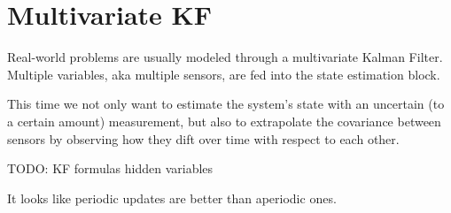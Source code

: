 \section{Multivariate KF}
Real-world problems are usually modeled through a multivariate Kalman Filter.
Multiple variables, aka multiple sensors, are fed into the state estimation block.

This time we not only want to estimate the system's state with an uncertain (to a certain amount) measurement, but also to extrapolate the covariance between sensors by observing how they dift over time with respect to each other.

TODO: KF formulas hidden variables

It looks like periodic updates are better than aperiodic ones.